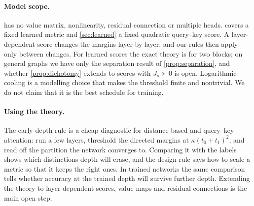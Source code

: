 \documentclass[10pt]{article}
\theoremstyle{definition}
\theoremstyle{remark}
\begin{document}
\paragraph{Model scope.}  has no value matrix, nonlinearity, residual connection or multiple heads.  covers
a fixed learned metric and \cref{sec:learned} a fixed quadratic query--key score. A layer-dependent score changes the margins layer by layer,
and our rules then apply only between changes. For learned scores the exact theory is for two blocks; on general graphs we have only the
separation result of \cref{prop:separation}, and whether \cref{prop:dichotomy} extends to scores with $J_s\succ0$ is open. Logarithmic cooling is a modelling choice that makes the threshold finite and nontrivial. We do not claim that it is the best
schedule for training.

\paragraph{Using the theory.} The early-depth rule is a cheap diagnostic for distance-based and query--key attention: run a few layers,
threshold the directed margins at $\kappa(t_0+t_1)^2$, and read off the partition the network converges to. Comparing it with the labels shows
which distinctions depth will erase, and the design rule says how to scale a metric so that it keeps the right ones. In trained networks the
same comparison tells whether accuracy at the trained depth will survive further depth. Extending the theory to layer-dependent scores, value
maps and residual connections is the main open step.




\clearpage
\appendix

\end{document}
